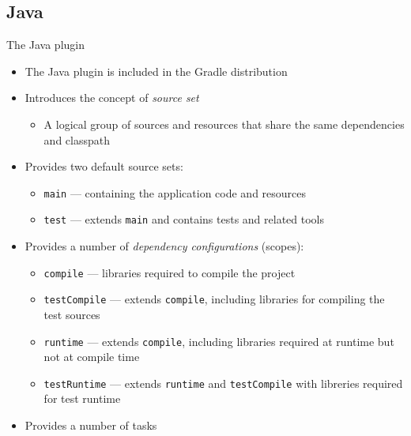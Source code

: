 \documentclass[presentation]{beamer}
\begin{document}
\subsection{Java}

\begin{frame}[fragile]{The Java plugin \cite{java-gradle-plugin}}
    \begin{itemize}
        \item The Java plugin is included in the Gradle distribution
        \item Introduces the concept of \textit{source set}
        \begin{itemize}
            \item A logical group of sources and resources that share the same dependencies and classpath
        \end{itemize}
        \item Provides two default source sets:
        \begin{itemize}
            \item \texttt{main} --- containing the application code and resources
            \item \texttt{test} --- extends \texttt{main} and contains tests and related tools
        \end{itemize}
        \item Provides a number of \textit{dependency configurations} (scopes):
        \begin{itemize}
            \item \texttt{compile} --- libraries required to compile the project
            \item \texttt{testCompile} --- extends \texttt{compile}, including libraries for compiling the test sources
            \item \texttt{runtime} --- extends \texttt{compile}, including libraries required at runtime but not at compile time
            \item \texttt{testRuntime} --- extends \texttt{runtime} and \texttt{testCompile} with libreries required for test runtime
        \end{itemize}
        \item Provides a number of tasks 
    \end{itemize}
\end{frame}
\end{document}
